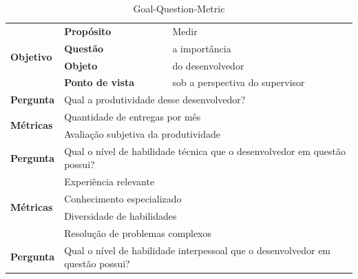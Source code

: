 \begin{table}[h]
	\caption{Goal-Question-Metric}
	\label{tabela2}
	\def\arraystretch{1.5}
	\begin{tabular}{|p{2cm}|p{6.25cm}|p{6.25cm}|}
		\hline
		\multirow{4}{*}{\textbf{Objetivo}} & \textbf{Propósito}                              & Medir                                                 \\ \cline{2-3} 
		& \textbf{Questão}                                & a importância                                         \\ \cline{2-3} 
		& \textbf{Objeto}                                 & do desenvolvedor                                      \\ \cline{2-3} 
		& \textbf{Ponto de vista}                         & sob a perspectiva do supervisor                       \\ \hline
		\textbf{Pergunta}                  & \multicolumn{2}{l|}{Qual a produtividade desse desenvolvedor?}                                          \\ \hline\hline
		\multirow{2}{*}{\textbf{Métricas}} & \multicolumn{2}{l|}{Quantidade de entregas por mês}                                                     \\ \cline{2-3} 
		& \multicolumn{2}{l|}{Avaliação subjetiva da produtividade}                                               \\ \hline\hline
		\textbf{Pergunta}                  & \multicolumn{2}{l|}{\parbox[c][1.2cm][c]{12cm}{ Qual o nível de habilidade técnica que o desenvolvedor em questão possui?}}          \\ \hline
		\multirow{4}{*}{\textbf{Métricas}} & \multicolumn{2}{l|}{Experiência relevante}                                                              \\ \cline{2-3} 
		& \multicolumn{2}{l|}{Conhecimento especializado}                                                         \\ \cline{2-3} 
		& \multicolumn{2}{l|}{Diversidade de habilidades}                                                         \\ \cline{2-3} 
		& \multicolumn{2}{l|}{Resolução de problemas complexos}                                                   \\ \hline\hline
		\textbf{Pergunta}                  & \multicolumn{2}{l|}{\parbox[c][1.2cm][c]{12cm}{Qual o nível de habilidade interpessoal que o desenvolvedor em questão possui?}}     \\ \hline

\end{tabular}
\end{table}
